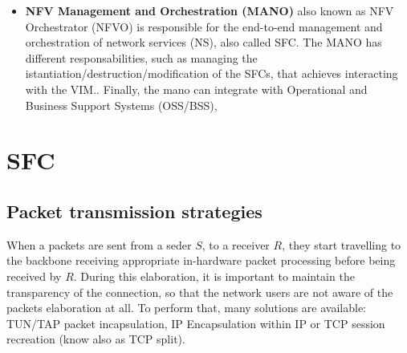 \documentclass[10pt]{book}
\begin{document}
\begin{itemize}
\item \textbf{NFV Management and Orchestration (MANO)} also known as NFV
  Orchestrator (NFVO) is responsible for the end-to-end management and
  orchestration of network services (NS), also called SFC. The MANO has
  different responsabilities, such as managing the
  istantiation/destruction/modification of the SFCs, that achieves interacting
  with the VIM.. Finally, the mano can integrate with 
Operational and Business Support Systems (OSS/BSS), 

\end{itemize}


\section{SFC}


\subsection{Packet transmission strategies}

When a packets are sent from a seder $S$, to a receiver $R$, they start
travelling to the backbone receiving appropriate in-hardware packet processing
before being received by $R$. During this elaboration, it is important to
maintain the transparency of the connection, so that the network users are not
aware of the packets elaboration at all. To perform that, many solutions are
available: TUN/TAP packet incapsulation, IP Encapsulation within IP or TCP
session recreation (know also as TCP split).
\end{document}
